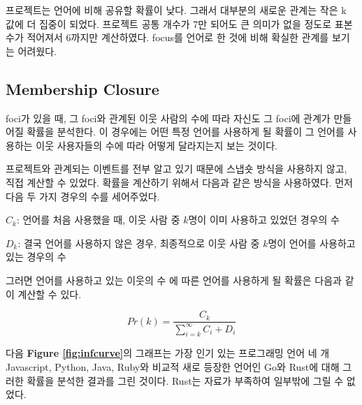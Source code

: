 \documentclass[10pt, a4paper, titlepage]{article}
\begin{document}
프로젝트는 언어에 비해 공유할 확률이 낮다. 그래서 대부분의 새로운 관계는 작은 k 값에 더 집중이 되었다. 프로젝트 공통 개수가 7만 되어도 큰 의미가 없을 정도로 표본 수가 적어져서 6까지만 계산하였다. focus를 언어로 한 것에 비해 확실한 관계를 보기는 어려웠다.



\subsection{Membership Closure}


foci가 있을 때, 그 foci와 관계된 이웃 사람의 수에 따라 자신도 그 foci에 관계가 만들어질 확률을 분석한다. 이 경우에는 어떤 특정 언어를 사용하게 될 확률이 그 언어를 사용하는 이웃 사용자들의 수에 따라 어떻게 달라지는지 보는 것이다.

프로젝트와 관계되는 이벤트를 전부 알고 있기 때문에 스냅숏 방식을 사용하지 않고, 직접 계산할 수 있었다. 확률을 계산하기 위해서 다음과 같은 방식을 사용하였다. 먼저 다음 두 가지 경우의 수를 세어주었다.


$C_k$: 언어를 처음 사용했을 때, 이웃 사람 중 $k$명이 이미 사용하고 있었던 경우의 수

$D_k$: 결국 언어를 사용하지 않은 경우, 최종적으로 이웃 사람 중 $k$명이 언어를 사용하고 있는 경우의 수

그러면 언어를 사용하고 있는 이웃의 수 에 따른 언어를 사용하게 될 확률은 다음과 같이 계산할 수 있다.


$$
Pr(k) = \frac{C_k}{\sum_{i=k}^{\infty}{C_i + D_i} }
$$

다음 {\bf Figure \ref{fig:infcurve}}의 그래프는 가장 인기 있는 프로그래밍 언어 네 개 Javascript, Python, Java, Ruby와 비교적 새로 등장한 언어인 Go와 Rust에 대해 그러한 확률을 분석한 결과를 그린 것이다. Rust는 자료가 부족하여 일부밖에 그릴 수 없었다.
\end{document}

